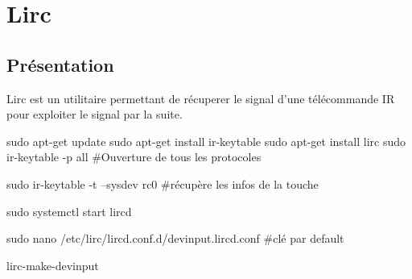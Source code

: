 \chapter{Lirc}


\section{Présentation}


Lirc est un utilitaire permettant de récuperer le signal d'une télécommande IR pour exploiter le signal par la suite.


\begin{Bash} 

sudo apt-get update
sudo apt-get install ir-keytable
sudo apt-get install lirc
sudo ir-keytable -p all #Ouverture de tous les protocoles


sudo ir-keytable -t --sysdev rc0 #récupère les infos de la touche


sudo systemctl start lircd



sudo nano /etc/lirc/lircd.conf.d/devinput.lircd.conf #clé par default

lirc-make-devinput

\end{Bash}